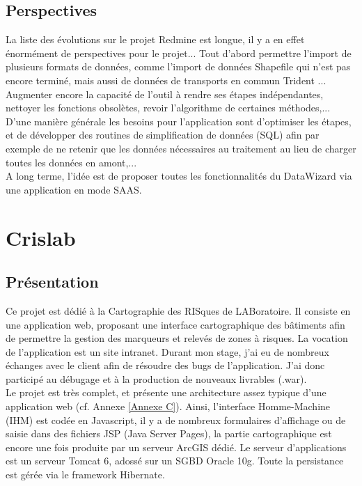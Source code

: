 \begin{itemize}
\subsection{Perspectives}

La liste des évolutions sur le projet Redmine est longue, il y a en effet énormément de perspectives pour le projet... Tout d'abord permettre l'import de plusieurs formats de données, comme l'import de données \og Shapefile \fg qui n'est pas encore terminé, mais aussi de données de transports en commun \og Trident \fg... 
Augmenter encore la capacité de l'outil à rendre ses étapes indépendantes, nettoyer les fonctions obsolètes, revoir l'algorithme de certaines méthodes,...
D'une manière générale les besoins pour l'application sont d'optimiser les étapes, et de développer des routines de simplification de données (SQL) afin par exemple de ne retenir que les données nécessaires au traitement au lieu de charger toutes les données en amont,... \\

A long terme, l'idée est de proposer toutes les fonctionnalités du DataWizard via une application en mode SAAS.\\


\section{Crislab}\label{Divers}

\subsection{Présentation} 

Ce projet est dédié à la Cartographie des RISques de LABoratoire. Il consiste en une application web, proposant une interface cartographique des bâtiments afin de permettre la gestion des marqueurs et relevés de zones à risques. La vocation de l'application est un site intranet. Durant mon stage, j'ai eu de nombreux échanges avec le client afin de résoudre des bugs de l'application. J'ai donc participé au débugage et à la production de nouveaux livrables (.war).\\

Le projet est très complet, et présente une architecture assez typique d'une application web (cf. Annexe \ref{Annexe C}). Ainsi, l'interface Homme-Machine (IHM) est codée en Javascript, il y a de nombreux formulaires d'affichage ou de saisie dans des fichiers JSP  (Java Server Pages), la partie cartographique est encore une fois produite par un serveur ArcGIS dédié. Le serveur d'applications est un serveur Tomcat 6, adossé sur un SGBD Oracle 10g. Toute la persistance est gérée via le framework Hibernate.\\


\end{itemize}
